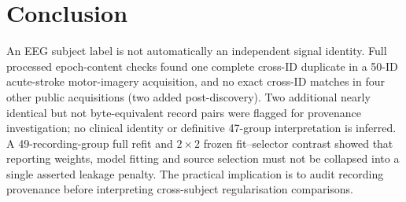 \documentclass[preprint,12pt]{elsarticle}
\begin{document}










\section{Conclusion}
An EEG subject label is not automatically an independent
signal identity. Full processed epoch-content checks found
one complete cross-ID duplicate in a 50-ID acute-stroke
motor-imagery acquisition, and no exact cross-ID matches
in four other public acquisitions (two added post-discovery).
Two additional nearly identical but not byte-equivalent
record pairs were flagged for provenance investigation;
no clinical identity or definitive 47-group interpretation
is inferred. A 49-recording-group
full refit and $2\times2$ frozen fit--selector contrast
showed that reporting weights, model fitting and source
selection must not be collapsed into a single asserted
leakage penalty. The practical implication is to audit
recording provenance before interpreting cross-subject
regularisation comparisons.
\end{document}
